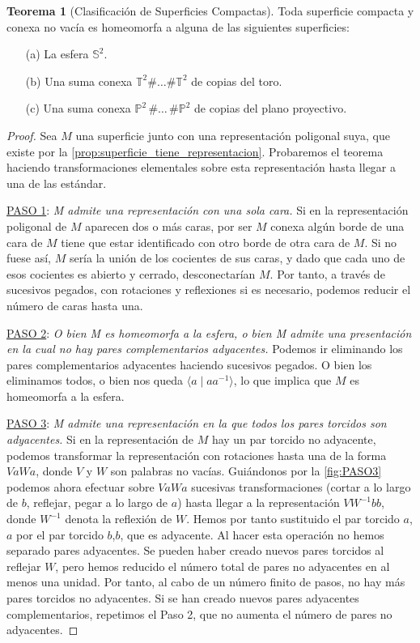 \documentclass[10pt]{report}
\newcommand{\Esfera}{\mathbb{S}^2}
\newcommand{\Toro}{\mathbb{T}^2}
\newcommand{\Proyectivo}{\mathbb{P}^2}
\theoremstyle{definition}
\newtheorem{tma}[defin]{Teorema}
\begin{document}
\begin{tma}[Clasificación de Superficies Compactas]\label{teo:csc}
Toda superficie compacta y conexa no vacía es homeomorfa a alguna de las siguientes superficies:
\begin{itemize}
\item[(a)] La esfera $\Esfera$.
\item[(b)] Una suma conexa $\Toro \# \dots \# \Toro$ de copias del toro.
\item[(c)] Una suma conexa $\Proyectivo \,  \# \dots\, \# \Proyectivo$ de copias del plano proyectivo. 
\end{itemize}
\end{tma}
\begin{proof}
Sea $M$ una superficie junto con una representación poligonal suya, que existe por la \autoref{prop:superficie_tiene_representacion}. Probaremos el teorema haciendo transformaciones elementales sobre esta representación hasta llegar a una de las estándar.

\underline{PASO 1}: \textit{M admite una representación con una sola cara.} Si en la representación poligonal de $M$ aparecen dos o más caras, por ser $M$ conexa algún borde de una cara de $M$ tiene que estar identificado con otro borde de otra cara de $M$. Si no fuese así, $M$ sería la unión de los cocientes de sus caras, y dado que cada uno de esos cocientes es abierto y cerrado, desconectarían $M$. Por tanto, a través de sucesivos pegados, con rotaciones y reflexiones si es necesario, podemos reducir el número de caras hasta una.

\underline{PASO 2}: \textit{O bien M es homeomorfa a la esfera, o bien M admite una presentación en la cual no hay pares complementarios adyacentes.} Podemos ir eliminando los pares complementarios adyacentes haciendo sucesivos pegados. O bien los eliminamos todos, o bien nos queda $\langle a\mid aa^{-1}\rangle$, lo que implica que $M$ es homeomorfa a la esfera.

\underline{PASO 3}: \textit{M admite una representación en la que todos los pares torcidos son adyacentes.} Si en la representación de $M$ hay un par torcido no adyacente, podemos transformar la representación con rotaciones hasta una de la forma $VaWa$, donde $V$ y $W$ son palabras no vacías. Guiándonos por la \autoref{fig:PASO3} podemos ahora efectuar sobre $VaWa$ sucesivas transformaciones (cortar a lo largo de $b$, reflejar, pegar a lo largo de $a$) hasta llegar a la representación $VW^{-1}bb$, donde $W^{-1}$ denota la reflexión de $W$. Hemos por tanto sustituido el par torcido $a$,$a$ por el par torcido $b$,$b$, que es adyacente. Al hacer esta operación no hemos separado pares adyacentes. Se pueden haber creado nuevos pares torcidos al reflejar $W$, pero hemos reducido el número total de pares no adyacentes en al menos una unidad. Por tanto, al cabo de un número finito de pasos, no hay más pares torcidos no adyacentes. Si se han creado nuevos pares adyacentes complementarios, repetimos el Paso 2, que no aumenta el número de pares no adyacentes.


\end{proof}
\end{document}
